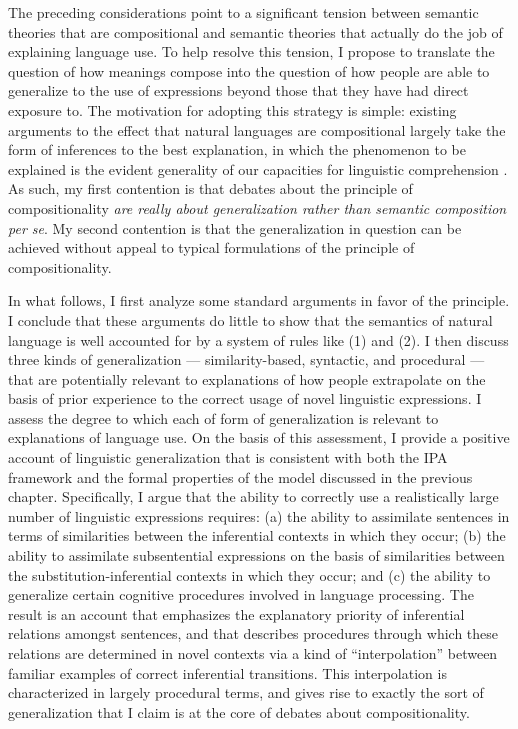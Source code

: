 The preceding considerations point to a significant tension between semantic theories that are compositional and semantic theories that actually do the job of explaining language use. To help resolve this tension, I propose to translate the question of how meanings compose into the question of how people are able to generalize to the use of expressions beyond those that they have had direct exposure to. The motivation for adopting this strategy is simple: existing arguments to the effect that natural languages are compositional largely take the form of inferences to the best explanation, in which the phenomenon to be explained is the evident generality of our capacities for linguistic comprehension \citep{Szabo:2013,Szabo:2012}. As such, my first contention is that debates about the principle of compositionality \textit{are really about generalization rather than semantic composition per se}. My second contention is that the generalization in question can be achieved without appeal to typical formulations of the principle of compositionality.

In what follows, I first analyze some standard arguments in favor of the principle. I conclude that these arguments do little to show that the semantics of natural language is well accounted for by a system of rules like (1) and (2). I then discuss three kinds of generalization --- similarity-based, syntactic, and procedural --- that are potentially relevant to explanations of how people extrapolate on the basis of prior experience to the correct usage of novel linguistic expressions. I assess the degree to which each of form of generalization is relevant to explanations of language use. On the basis of this assessment, I provide a positive account of linguistic generalization that is consistent with both the IPA framework and the formal properties of the model discussed in the previous chapter. Specifically, I argue that the ability to correctly use a realistically large number of linguistic expressions requires: (a) the ability to assimilate sentences in terms of similarities between the inferential contexts in which they occur; (b) the ability to assimilate subsentential expressions on the basis of similarities between the substitution-inferential contexts in which they occur; and (c) the ability to generalize certain cognitive procedures involved in language processing. The result is an account that emphasizes the explanatory priority of inferential relations amongst sentences, and that describes procedures through which these relations are determined in novel contexts via a kind of ``interpolation'' between familiar examples of correct inferential transitions. This interpolation is characterized in largely procedural terms, and gives rise to exactly the sort of generalization that I claim is at the core of debates about compositionality.

